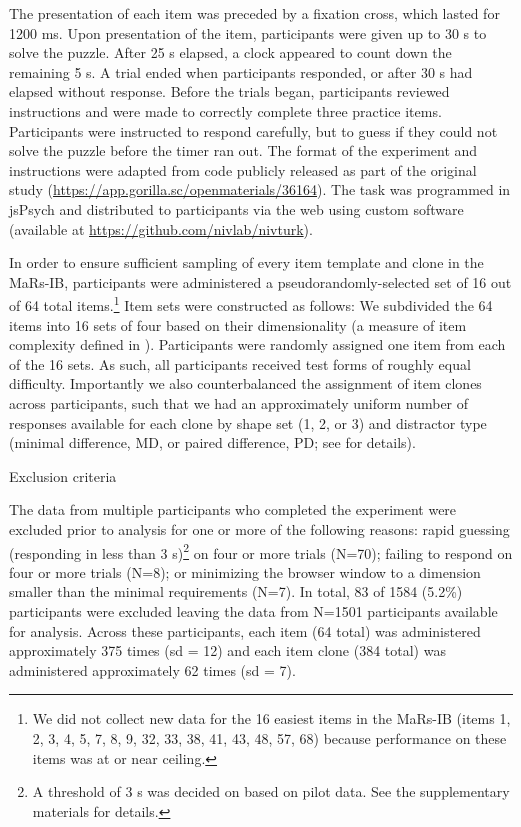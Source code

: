 \documentclass[a4paper,man,natbib]{apa6}
\makeatletter
\renewcommand{\subsubsection}{\@startsection{subsubsection}{3}
  {\z@}%
  {\b@level@two@skip}{\e@level@two@skip}%
  {\normalfont\normalsize\bfseries}}
\makeatother
\begin{document}
The presentation of each item was preceded by a fixation cross, which lasted for 1200 ms. Upon presentation of the item, participants were given up to 30 s to solve the puzzle. After 25 s elapsed, a clock appeared to count down the remaining 5 s. A trial ended when participants responded, or after 30 s had elapsed without response. Before the trials began, participants reviewed instructions and were made to correctly complete three practice items. Participants were instructed to respond carefully, but to guess if they could not solve the puzzle before the timer ran out. The format of the experiment and instructions were adapted from code publicly released as part of the original study (\url{https://app.gorilla.sc/openmaterials/36164}). The task was programmed in jsPsych \citep{de2015jspsych} and distributed to participants via the web using custom software (available at \url{https://github.com/nivlab/nivturk}). 

In order to ensure sufficient sampling of every item template and clone in the MaRs-IB, participants were administered a pseudorandomly-selected set of 16 out of 64 total items.\footnote{We did not collect new data for the 16 easiest items in the MaRs-IB (items 1, 2, 3, 4, 5, 7, 8, 9, 32, 33, 38, 41, 43, 48, 57, 68) because performance on these items was at or near ceiling.} Item sets were constructed as follows: We subdivided the 64 items into 16 sets of four based on their dimensionality (a measure of item complexity defined in \citealt{chierchia2019matrix}). Participants were randomly assigned one item from each of the 16 sets. As such, all participants received test forms of roughly equal difficulty. Importantly we also counterbalanced the assignment of item clones across participants, such that we had an approximately uniform number of responses available for each clone by shape set (1, 2, or 3) and distractor type (minimal difference, MD, or paired difference, PD; see \citealt{chierchia2019matrix} for details). 

\subsubsection{Exclusion criteria}

The data from multiple participants who completed the experiment were excluded prior to analysis for one or more of the following reasons: rapid guessing (responding in less than 3 s)\footnote{A threshold of 3 s was decided on based on pilot data. See the supplementary materials for details.} on four or more trials (N=70); failing to respond on four or more trials (N=8); or minimizing the browser window to a dimension smaller than the minimal requirements (N=7). In total, 83 of 1584 (5.2\%) participants were excluded leaving the data from N=1501 participants available for analysis. Across these participants, each item (64 total) was administered approximately 375 times (sd = 12) and each item clone (384 total) was administered approximately 62 times (sd = 7). 
\end{document}
